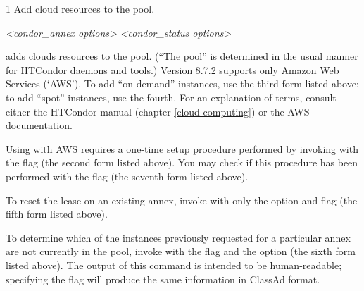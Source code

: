 \begin{ManPage}{\label{man-condor-annex}}{1}
{Add cloud resources to the pool.}

\Synopsis

 

 

 

 



 

 \emph{<condor\_annex options>}  \emph{<condor\_status options>}

\Description

 adds clouds resources to the pool.  (``The pool'' is determined
in the usual manner for HTCondor daemons and tools.)  Version 8.7.2 supports
only Amazon Web Services (`AWS').  To add ``on-demand'' instances, use
the third form listed above; to add ``spot'' instances, use the fourth.  For an
explanation of terms, consult either the HTCondor manual
(chapter \ref{cloud-computing}) or the AWS documentation.

Using  with AWS requires a one-time setup procedure
performed by invoking  with the  flag
(the second form listed above).  You may check if this procedure has been
performed with the  flag (the seventh form listed above).

To reset the lease on an existing annex, invoke  with
only the  option and  flag (the fifth form
listed above).

To determine which of the instances previously requested for a
particular annex are not currently in the pool, invoke 
with the  flag and the  option (the sixth
form listed above).  The output of this command is intended to be
human-readable; specifying the  flag will produce the
same information in ClassAd format.


\end{ManPage}
